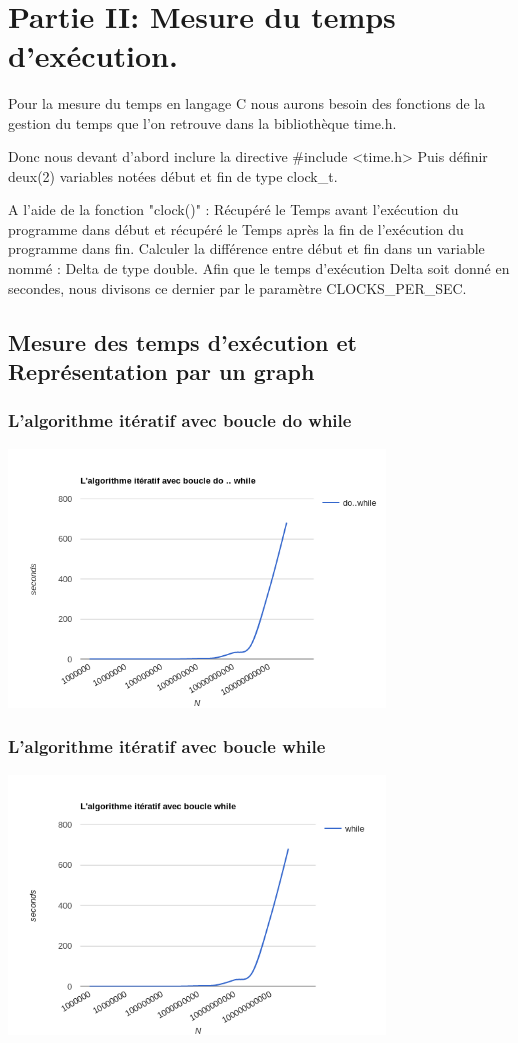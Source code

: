 \documentclass[•]{article}
\begin{document}
\textrm{  }
\\

\section{Partie II: Mesure du temps d'exécution.}
\textrm{
Pour la mesure du temps en langage C nous aurons besoin des fonctions de la gestion du temps que l'on retrouve dans la bibliothèque time.h.}

\textrm{Donc nous devant d'abord inclure la directive \#include <time.h>
Puis définir deux(2) variables notées début et fin de type clock\_t.}

\textrm{A l'aide de la fonction "clock()" :
Récupéré le Temps avant l'exécution du programme dans début et
récupéré le Temps après la fin de l'exécution du programme dans fin.}
\textrm{Calculer la différence entre début et fin dans un variable nommé : Delta de type double.} 
\textrm{Afin que le temps d'exécution Delta soit donné en secondes, nous divisons ce dernier par le paramètre CLOCKS\_PER\_SEC.}

\subsection{Mesure des temps d'exécution et Représentation par un graph}
\subsubsection{L'algorithme itératif avec boucle do while}
\includegraphics[width=0.75\textwidth]{dowhile.png}
\subsubsection{L'algorithme itératif avec boucle while}
\includegraphics[width=0.75\textwidth]{while.png}
\end{document}
